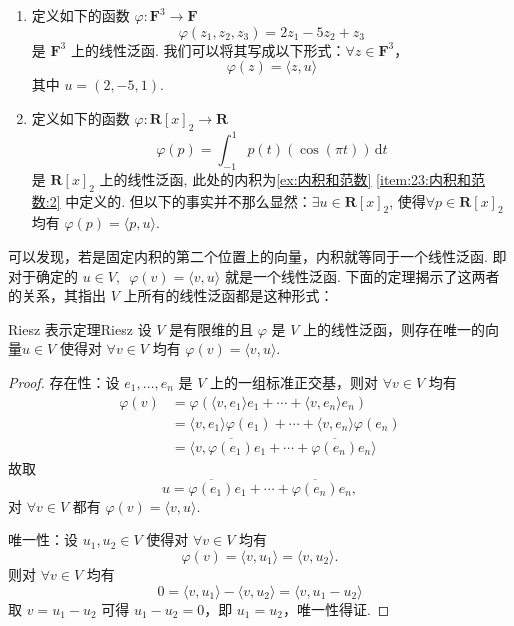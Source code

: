 \begin{example}{}{}
    \begin{enumerate}
        \item 定义如下的函数 $\varphi\colon \mathbf{F}^{3} \rightarrow \mathbf{F}$
              \[\varphi(z_1, z_2, z_3) = 2z_1 - 5z_2 + z_3\]
              是 $\mathbf{F}^{3}$ 上的线性泛函. 我们可以将其写成以下形式：$ \forall z \in \mathbf{F}^{3}$，
              \[\varphi(z) = \langle z, u\rangle\]
              其中 $u = (2, -5, 1)$.

        \item 定义如下的函数 $\varphi\colon \mathbf{R}[x]_2 \rightarrow \mathbf{R}$
              \[\varphi(p) = \int_{-1}^1 p(t)(\cos(\pi t))\,\mathrm{d}t\]
              是 $\mathbf{R}[x]_2$ 上的线性泛函, 此处的内积为\autoref{ex:内积和范数} \ref*{item:23:内积和范数:2} 中定义的. 但以下的事实并不那么显然：$ \exists u \in \mathbf{R}[x]_2$, 使得$\forall p \in \mathbf{R}[x]_2$ 均有 $ \varphi (p) = \langle p, u\rangle $.
    \end{enumerate}
\end{example}

可以发现，若是固定内积的第二个位置上的向量，内积就等同于一个线性泛函. 即对于确定的 $ u \in V , \enspace \varphi(v) = \langle v, u \rangle$ 就是一个线性泛函. 下面的定理揭示了这两者的关系，其指出 $ V $ 上所有的线性泛函都是这种形式：
\begin{theorem}{Riesz 表示定理}{Riesz} 
    设 $ V $ 是有限维的且 $ \varphi $ 是 $ V $ 上的线性泛函，则存在唯一的向量$u \in V$ 使得对 $\forall v \in V$ 均有 $ \varphi(v) = \langle v, u\rangle $.
\end{theorem}

\begin{proof}
    存在性：设 $e_1, \ldots , e_n$ 是 $ V $ 上的一组标准正交基，则对 $\forall v \in V $ 均有
    \begin{align*}
        \varphi (v) & = \varphi(\langle v, e_1 \rangle e_1 + \cdots + \langle v, e_n \rangle e_n )           \\
                    & = \langle v, e_1 \rangle \varphi (e_1) + \cdots + \langle v, e_n \rangle \varphi (e_n) \\
                    & = \langle v, \overline{\varphi(e_1)}e_1 + \cdots + \overline{\varphi(e_n)}e_n \rangle
    \end{align*}
    故取
    \[ u = \overline{\varphi(e_1)}e_1 + \cdots + \overline{\varphi(e_n)}e_n, \]
    对 $\forall v \in V$ 都有 $\varphi(v) = \langle v, u \rangle $.

    唯一性：设 $ u_1, u_2 \in V $ 使得对 $\forall v \in V $ 均有
    \[\varphi(v) = \langle v, u_1 \rangle = \langle v, u_2 \rangle.\]
    则对 $\forall v \in V $ 均有
    \[ 0 = \langle v, u_1 \rangle - \langle v, u_2 \rangle = \langle v, u_1 - u_2 \rangle\]
    取 $ v = u_1 - u_2 $ 可得 $ u_1 - u_2 = 0 $，即 $ u_1 = u_2 $，唯一性得证.
\end{proof}

